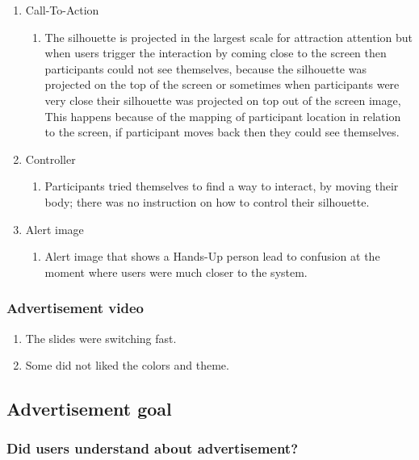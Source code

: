 \begin{enumerate}
\item	Call-To-Action
\begin{enumerate}
\item	The silhouette is projected in the largest scale for attraction attention but when users trigger the interaction by coming close to the screen then participants could not see themselves, because the silhouette was projected on the top of the screen or sometimes when participants were very close their silhouette was projected on top out of the screen image, This happens because of the mapping of participant location in relation to the screen, if participant moves back then they could see themselves. 
\end{enumerate}

\item	Controller
\begin{enumerate}
\item	Participants tried themselves to find a way to interact, by moving their body; there was no instruction on how to control their silhouette.
\end{enumerate}

\item	Alert image
\begin{enumerate}
\item	Alert image that shows a Hands-Up person lead to confusion at the moment where users were much closer to the system.
\end{enumerate}
\end{enumerate}

\subsubsection{Advertisement video}
\begin{enumerate}
\item The slides were switching fast.
\item Some did not liked the colors and theme. 
\end{enumerate}


\subsection{Advertisement goal}

\subsubsection{Did users understand about advertisement?}

